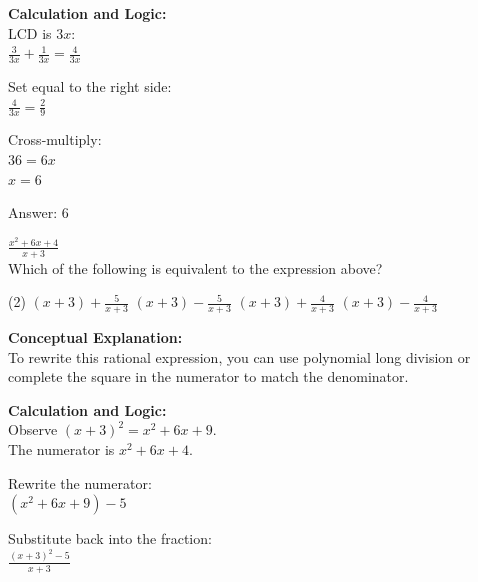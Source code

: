 \documentclass[11pt,paper=a4,answers]{exam}
\begin{document}
\begin{questions}
\begin{solution}
\vspace{20pt}

\textbf{Calculation and Logic:} \\
LCD is $3x$: \\
$\frac{3}{3x} + \frac{1}{3x} = \frac{4}{3x}$

\vspace{10pt}

Set equal to the right side: \\
$\frac{4}{3x} = \frac{2}{9}$

\vspace{10pt}

Cross-multiply: \\
$36 = 6x$ \\
$x = 6$

\vspace{25pt}

Answer: \colorbox{yellow!100}{6}
\end{solution}

\vspace{40pt}

\question
$\frac{x^2+6x+4}{x+3}$ \\
Which of the following is equivalent to the expression above?
\begin{tasks}(2)
    \task $(x+3) + \frac{5}{x+3}$
    \task $(x+3) - \frac{5}{x+3}$
    \task $(x+3) + \frac{4}{x+3}$
    \task $(x+3) - \frac{4}{x+3}$
\end{tasks}

\begin{solution}
\textbf{Conceptual Explanation:} \\
To rewrite this rational expression, you can use polynomial long division or complete the square in the numerator to match the denominator.

\vspace{20pt}

\textbf{Calculation and Logic:} \\
Observe $(x+3)^2 = x^2 + 6x + 9$. \\
The numerator is $x^2 + 6x + 4$.

\vspace{10pt}

Rewrite the numerator: \\
$(x^2 + 6x + 9) - 5$

\vspace{10pt}

Substitute back into the fraction: \\
$\frac{(x+3)^2 - 5}{x+3}$


\end{solution}
\end{questions}
\end{document}
